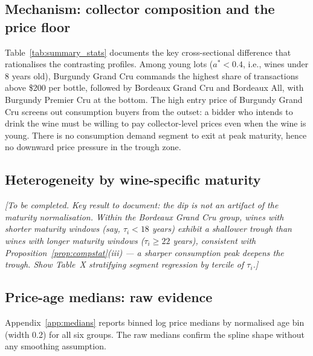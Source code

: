 \subsection{Mechanism: collector composition and the price floor}

Table~\ref{tab:summary_stats} documents the key cross-sectional difference that rationalises
the contrasting profiles. Among young lots ($a^* < 0.4$, i.e., wines under 8 years old),
Burgundy Grand Cru commands the highest share of transactions above \$200 per bottle,
followed by Bordeaux Grand Cru and Bordeaux All, with Burgundy Premier Cru at the bottom.
The high entry price of Burgundy Grand Cru screens out consumption buyers from the outset:
a bidder who intends to drink the wine must be willing to pay collector-level prices even when
the wine is young. There is no consumption demand segment to exit at peak maturity, hence no
downward price pressure in the trough zone.



\subsection{Heterogeneity by wine-specific maturity}
\label{sec:results:heterogeneity}

\noindent\textit{[To be completed. Key result to document: the dip is not an artifact of
the maturity normalisation. Within the Bordeaux Grand Cru group, wines with shorter
maturity windows (say, $\tau_i < 18$ years) exhibit a shallower trough than wines with
longer maturity windows ($\tau_i \geq 22$ years), consistent with Proposition~\ref{prop:compstat}(iii)
--- a sharper consumption peak deepens the trough.
Show Table~X stratifying segment regression by tercile of $\tau_i$.]}

\subsection{Price-age medians: raw evidence}
\label{sec:results:medians}

Appendix~\ref{app:medians} reports binned log price medians by normalised age bin (width 0.2)
for all six groups. The raw medians confirm the spline shape without any smoothing assumption.
